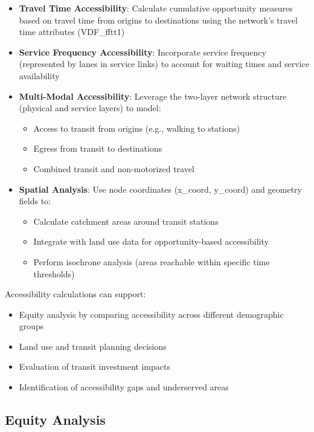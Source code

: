 \documentclass[11pt,a4paper]{article}
\begin{document}
\begin{itemize}
    \item \textbf{Travel Time Accessibility}: Calculate cumulative opportunity measures based on travel time from origins to destinations using the network's travel time attributes (VDF\_fftt1)
    \item \textbf{Service Frequency Accessibility}: Incorporate service frequency (represented by lanes in service links) to account for waiting times and service availability
    \item \textbf{Multi-Modal Accessibility}: Leverage the two-layer network structure (physical and service layers) to model:
    \begin{itemize}
        \item Access to transit from origins (e.g., walking to stations)
        \item Egress from transit to destinations
        \item Combined transit and non-motorized travel
    \end{itemize}
    \item \textbf{Spatial Analysis}: Use node coordinates (x\_coord, y\_coord) and geometry fields to:
    \begin{itemize}
        \item Calculate catchment areas around transit stations
        \item Integrate with land use data for opportunity-based accessibility
        \item Perform isochrone analysis (areas reachable within specific time thresholds)
    \end{itemize}
\end{itemize}

Accessibility calculations can support:
\begin{itemize}
    \item Equity analysis by comparing accessibility across different demographic groups
    \item Land use and transit planning decisions
    \item Evaluation of transit investment impacts
    \item Identification of accessibility gaps and underserved areas
\end{itemize}

\subsection{Equity Analysis}
\end{document}
